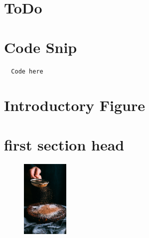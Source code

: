 \vspace{.15in}


\section{ToDo}

\section{Code Snip}
\begin{lstlisting}
  Code here
\end{lstlisting}

\section{Introductory Figure}

\section{first section head}

\begin{figure}
	\label{05:fig01} 
	\centering
	\includegraphics[width=0.2\textwidth]{gfx/05-cake} 
\end{figure}


